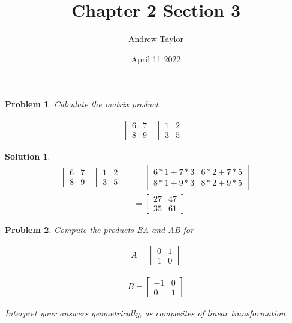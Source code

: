 \documentclass{article}
\title{Chapter 2 Section 3}
\author{Andrew Taylor}
\date{April 11 2022}
\newtheorem{problem}{Problem}
\newtheorem*{solution}{Solution}
\begin{document}
\maketitle

\begin{problem}
Calculate the matrix product

\begin{align*}
\begin{bmatrix}
6 & 7 \\
8 & 9
\end{bmatrix}
\begin{bmatrix}
1 & 2 \\
3 & 5
\end{bmatrix}
\end{align*}
\end{problem}

\begin{solution}
\begin{align*}
\begin{bmatrix}
6 & 7 \\
8 & 9
\end{bmatrix}
\begin{bmatrix}
1 & 2 \\
3 & 5
\end{bmatrix}
&= 
\begin{bmatrix}
6*1 + 7*3 & 6*2 + 7*5 \\
8*1 + 9*3 & 8*2 + 9*5
\end{bmatrix} \\
&= 
\begin{bmatrix}
27 & 47 \\
35 & 61
\end{bmatrix}
\end{align*}
\end{solution}

\begin{problem}
Compute the products BA and AB for 

\begin{align*}
A = \begin{bmatrix}0 & 1 \\ 1 & 0 \end{bmatrix}
\end{align*}

\begin{align*}
B = \begin{bmatrix}-1 & 0 \\ 0 & 1 \end{bmatrix} 
\end{align*}

Interpret your answers geometrically, as composites of linear transformation.
\end{problem}
\end{document}
